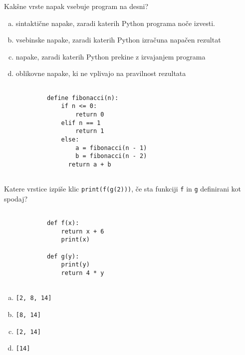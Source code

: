 \documentclass[arhiv, 10pt]{../izpit}
\newcommand{\inlinepy}[1]{\texttt{#1}}
\begin{document}
        \naloga*
        \begin{multicols}{2}
        \noindent
        Kakšne vrste napak vsebuje program na desni?

        \begin{enumerate}[(a)]
\item sintaktične napake, zaradi katerih Python programa noče izvesti.
\item vsebinske napake, zaradi katerih Python izračuna napačen rezultat
\item napake, zaradi katerih Python prekine z izvajanjem programa
\item oblikovne napake, ki ne vplivajo na pravilnost rezultata
\end{enumerate}

        \columnbreak

        \begin{verbatim}
        
            define fibonacci(n):
                if n <= 0:
                    return 0
                elif n == 1
                    return 1
                else:
                    a = fibonacci(n - 1)
                    b = fibonacci(n - 2)
                  return a + b
            
        \end{verbatim}

        \end{multicols}

    
        \naloga*
        Katere vrstice izpiše klic \inlinepy{print(f(g(2)))}, če sta funkciji \inlinepy{f} in \inlinepy{g} definirani kot spodaj?

        \begin{multicols}{2}
        \begin{verbatim}
        
            def f(x):
                return x + 6
                print(x)

            def g(y):
                print(y)
                return 4 * y
        
        \end{verbatim}

        \begin{enumerate}[(a)]
\item \inlinepy{[2, 8, 14]}
\item \inlinepy{[8, 14]}
\item \inlinepy{[2, 14]}
\item \inlinepy{[14]}
\end{enumerate}

        \end{multicols}
    
\end{document}
